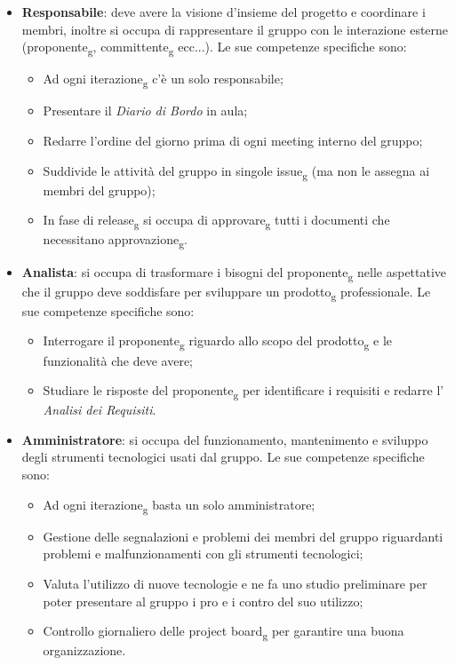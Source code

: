 \begin{itemize}
\item \textbf{Responsabile}: deve avere la visione d'insieme del progetto e coordinare i membri, inoltre si occupa di rappresentare il gruppo con le interazione esterne (proponente\textsubscript{g}, committente\textsubscript{g} ecc...). Le sue competenze specifiche sono:
\begin{itemize}
	\item Ad ogni iterazione\textsubscript{g} c'è un solo responsabile;
	\item Presentare il \textit{Diario di Bordo} in aula;
	\item Redarre l'ordine del giorno prima di ogni meeting interno del gruppo;
	\item Suddivide le attività del gruppo in singole issue\textsubscript{g} (ma non le assegna ai membri del gruppo);
	\item In fase di release\textsubscript{g} si occupa di approvare\textsubscript{g} tutti i documenti che necessitano approvazione\textsubscript{g}.
\end{itemize}

\item \textbf{Analista}: si occupa di trasformare i bisogni del proponente\textsubscript{g} nelle aspettative che il gruppo deve soddisfare per sviluppare un prodotto\textsubscript{g} professionale. Le sue competenze specifiche sono:
\begin{itemize}
	\item Interrogare il proponente\textsubscript{g} riguardo allo scopo del prodotto\textsubscript{g} e le funzionalità che deve avere;
	\item Studiare le risposte del proponente\textsubscript{g} per identificare i requisiti e redarre l' \textit{Analisi dei Requisiti}.
\end{itemize}

\item \textbf{Amministratore}: si occupa del funzionamento, mantenimento e sviluppo degli strumenti tecnologici usati dal gruppo. Le sue competenze specifiche sono:
\begin{itemize}
	\item Ad ogni iterazione\textsubscript{g} basta un solo amministratore;
	\item Gestione delle segnalazioni e problemi dei membri del gruppo riguardanti problemi e malfunzionamenti con gli strumenti tecnologici;
	\item Valuta l'utilizzo di nuove tecnologie e ne fa uno studio preliminare per poter presentare al gruppo i pro e i contro del suo utilizzo;
	\item Controllo giornaliero delle project board\textsubscript{g} per garantire una buona organizzazione.
\end{itemize}


\end{itemize}
